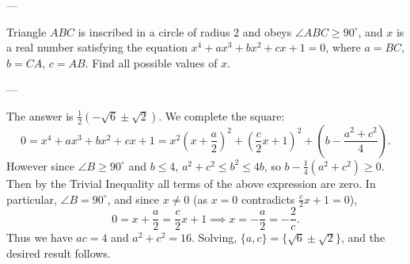 
---

Triangle $ABC$ is inscribed in a circle of radius $2$ and obeys $\angle ABC\ge90^\circ$, and $x$ is a real number satisfying the equation $x^4+ax^3+bx^2+cx+1=0$, where $a=BC$, $b=CA$, $c=AB$. Find all possible values of $x$.

---

The answer is $\tfrac12(-\sqrt6\pm\sqrt2)$. We complete the square: \[0=x^4+ax^3+bx^2+cx+1=x^2\left(x+\frac a2\right)^2+\left(\frac c2x+1\right)^2+\left(b-\frac{a^2+c^2}4\right).\]
However since $\angle B\ge90^\circ$ and $b\le 4$, $a^2+c^2\le b^2\le 4b$, so $b-\tfrac14(a^2+c^2)\ge0$. Then by the Trivial Inequality all terms of the above expression are zero. In particular, $\angle B=90^\circ$, and since $x\ne 0$ (as $x=0$ contradicts $\tfrac c2x+1=0$), \[0=x+\frac a2=\frac c2x+1\implies x=-\frac a2=-\frac2c.\]
Thus we have $ac=4$ and $a^2+c^2=16$. Solving, $\{a,c\}=\{\sqrt6\pm\sqrt2\}$, and the desired result follows.
